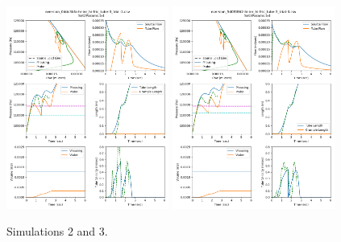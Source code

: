 \documentclass[letterpaper]{article}
\begin{document}
\clearpage
\begin{figure}\centering
\includegraphics[width=0.475\textwidth]{Set2result27-Jul.png}
\includegraphics[width=0.475\textwidth]{Set3result27-Jul.png}
\caption{Simulations 2 and 3.}
\end{figure}
\end{document}
